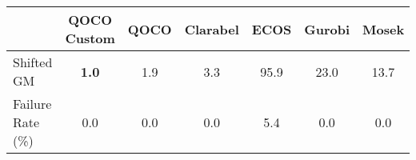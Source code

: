\begin{tabular}{lcccccc}
  \hline
    & \textbf{QOCO Custom}   & \textbf{QOCO} & \textbf{Clarabel} & \textbf{ECOS} & \textbf{Gurobi} & \textbf{Mosek} \\ \hline
  Shifted GM & \textbf{1.0} & 1.9 & 3.3 & 95.9 & 23.0 & 13.7 \\ 
  Failure Rate (\%) & 0.0 & 0.0 & 0.0 & 5.4 & 0.0 & 0.0 \\ \hline 
\end{tabular}
